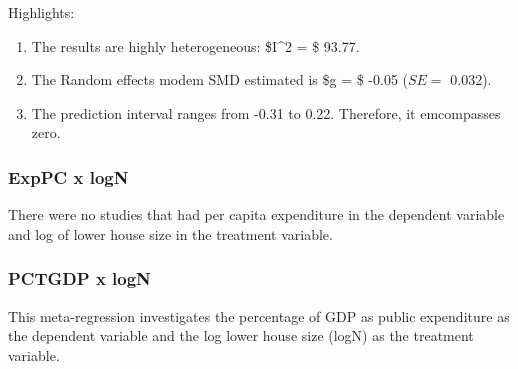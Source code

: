 \documentclass[
]{article}
\newenvironment{Shaded}{\begin{snugshade}}{\end{snugshade}}
\newcommand{\CommentTok}[1]{\textcolor[rgb]{0.56,0.35,0.01}{\textit{#1}}}
\newcommand{\DataTypeTok}[1]{\textcolor[rgb]{0.13,0.29,0.53}{#1}}
\newcommand{\KeywordTok}[1]{\textcolor[rgb]{0.13,0.29,0.53}{\textbf{#1}}}
\newcommand{\NormalTok}[1]{#1}
\newcommand{\OperatorTok}[1]{\textcolor[rgb]{0.81,0.36,0.00}{\textbf{#1}}}
\newcommand{\OtherTok}[1]{\textcolor[rgb]{0.56,0.35,0.01}{#1}}
\newcommand{\StringTok}[1]{\textcolor[rgb]{0.31,0.60,0.02}{#1}}
\providecommand{\tightlist}{%
  \setlength{\itemsep}{0pt}\setlength{\parskip}{0pt}}
\begin{document}
Highlights:

\begin{enumerate}
\def\labelenumi{\arabic{enumi}.}
\tightlist
\item
  The results are highly heterogeneous: \$I\^{}2 = \$ 93.77.
\item
  The Random effects modem SMD estimated is \$g = \$ -0.05 (\(SE =\)
  0.032).
\item
  The prediction interval ranges from -0.31 to 0.22. Therefore, it
  emcompasses zero.
\end{enumerate}

\newpage

\hypertarget{exppc-x-logn-1}{%
\subsubsection{ExpPC x logN}\label{exppc-x-logn-1}}

There were no studies that had per capita expenditure in the dependent
variable and log of lower house size in the treatment variable.

\hypertarget{pctgdp-x-logn-1}{%
\subsubsection{PCTGDP x logN}\label{pctgdp-x-logn-1}}

This meta-regression investigates the percentage of GDP as public
expenditure as the dependent variable and the log lower house size
(logN) as the treatment variable.

\begin{Shaded}
\end{Shaded}
\end{document}
